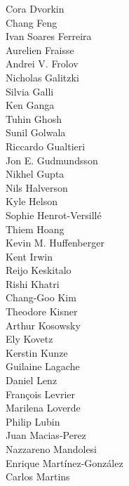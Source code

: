 \documentclass[PICOAPC.tex]{subfiles}
\begin{document}
{\begin{multicols}{4}
Cora Dvorkin                    \\
Chang Feng                      \\
Ivan Soares Ferreira            \\
Aurelien Fraisse                \\
Andrei V. Frolov                \\
Nicholas Galitzki               \\
Silvia Galli                    \\
Ken Ganga                       \\
Tuhin Ghosh                     \\
Sunil Golwala                   \\
Riccardo Gualtieri              \\
Jon E. Gudmundsson              \\
Nikhel Gupta                    \\
Nils Halverson                  \\
Kyle Helson                     \\
Sophie Henrot-Versill\'e        \\
Thiem Hoang                     \\
Kevin M. Huffenberger           \\
Kent Irwin                      \\
Reijo Keskitalo                 \\
Rishi Khatri                    \\
Chang-Goo Kim                   \\
Theodore Kisner                 \\
Arthur Kosowsky                 \\
Ely Kovetz                      \\
Kerstin Kunze                   \\
Guilaine Lagache                \\
Daniel Lenz                     \\
Fran\c{c}ois Levrier            \\
Marilena Loverde                \\
Philip Lubin                    \\
Juan Macias-Perez               \\
Nazzareno Mandolesi             \\
Enrique Mart\'{i}nez-Gonz\'{a}lez   \\
Carlos Martins                  \\

\end{multicols}}
\end{document}
